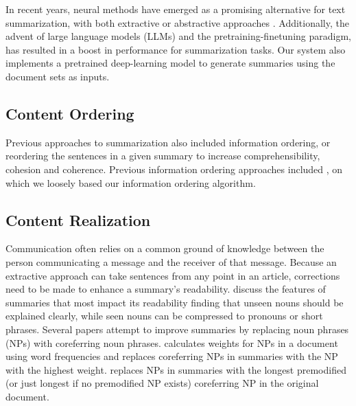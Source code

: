 In recent years, neural methods have emerged as a promising alternative for text summarization, with both extractive \cite{https://doi.org/10.48550/arxiv.1611.04244, narayan-etal-2018-ranking} or abstractive approaches \cite{chopra-etal-2016-abstractive, nallapati-etal-2016-abstractive, celikyilmaz-etal-2018-deep}. Additionally,  the advent of large language models (LLMs) and the pretraining-finetuning paradigm, has resulted in a  boost in performance for summarization tasks. Our system also implements a pretrained deep-learning model to generate summaries using the document sets as inputs. %

\subsection{Content Ordering}

Previous approaches to summarization also included information ordering, or reordering the sentences in a given summary to increase comprehensibility, cohesion and coherence. Previous information ordering approaches included \citep{barzilay_2002}, on which we loosely based our information ordering algorithm. 

\subsection{Content Realization}

Communication often relies on a common ground of knowledge between the person communicating a message and the receiver of that message. Because an extractive approach can take sentences from any point in an article, corrections need to be made to enhance a summary's readability. \citet{siddharthan-etal-2011-information} discuss the features of summaries that most impact its readability finding that unseen nouns should be explained clearly, while seen nouns can be compressed to pronouns or short phrases. Several papers attempt to improve summaries by replacing noun phrases (NPs) with coreferring noun phrases. \citet{nenkova2011automatic} calculates weights for NPs in a document using word frequencies and replaces coreferring NPs in summaries with the NP with the highest weight. \citet{siddharthan-etal-2011-information} replaces NPs in summaries with the longest premodified (or just longest if no premodified NP exists) coreferring NP in the original document.